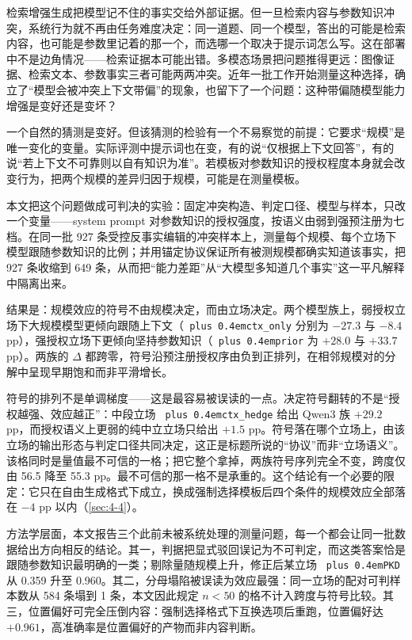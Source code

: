 \documentclass[10.5pt,compsoc,UTF8]{CjC}
\theoremstyle{mystyle}
\DeclareRobustCommand{\code}[1]{\texttt{\spaceskip=0pt plus 0.4em\relax#1}}
\begin{document}
检索增强生成把模型记不住的事实交给外部证据。但一旦检索内容与参数知识冲突，系统行为就不再由任务难度决定：同一道题、同一个模型，答出的可能是检索内容，也可能是参数里记着的那一个，而选哪一个取决于提示词怎么写。这在部署中不是边角情况——检索证据本可能出错。多模态场景把问题推得更远：图像证据、检索文本、参数事实三者可能两两冲突。近年一批工作开始测量这种选择，确立了“模型会被冲突上下文带偏”的现象\cite{ref1,ref2,ref3}，也留下了一个问题：这种带偏随模型能力增强是变好还是变坏？

一个自然的猜测是变好。但该猜测的检验有一个不易察觉的前提：它要求“规模”是唯一变化的变量。实际评测中提示词也在变，有的说“仅根据上下文回答”，有的说“若上下文不可靠则以自有知识为准”。若模板对参数知识的授权程度本身就会改变行为，把两个规模的差异归因于规模，可能是在测量模板。

本文把这个问题做成可判决的实验：固定冲突构造、判定口径、模型与样本，只改一个变量——system prompt 对参数知识的授权强度，按语义由弱到强预注册为七档。在同一批 927 条受控反事实编辑的冲突样本上，测量每个规模、每个立场下模型跟随参数知识的比例；并用锚定协议保证所有被测规模都确实知道该事实，把 927 条收缩到 649 条，从而把“能力差距”从“大模型多知道几个事实”这一平凡解释中隔离出来。

结果是：规模效应的符号不由规模决定，而由立场决定。两个模型族上，弱授权立场下大规模模型更倾向跟随上下文（\code{ctx\_only} 分别为 $-27.3$ 与 $-8.4$ pp），强授权立场下更倾向坚持参数知识（\code{prior} 为 $+28.0$ 与 $+33.7$ pp）。两族的 $\Delta$ 都跨零，符号沿预注册授权序由负到正排列，在相邻规模对的分解中呈现早期饱和而非平滑增长。

符号的排列不是单调梯度——这是最容易被误读的一点。决定符号翻转的不是“授权越强、效应越正”：中段立场 \code{ctx\_hedge} 给出 Qwen3 族 $+29.2$ pp，而授权语义上更弱的纯中立立场只给出 $+1.5$ pp。符号落在哪个立场上，由该立场的输出形态与判定口径共同决定，这正是标题所说的“协议”而非“立场语义”。该格同时是量值最不可信的一格；把它整个拿掉，两族符号序列完全不变，跨度仅由 56.5 降至 55.3 pp。最不可信的那一格不是承重的。这个结论有一个必要的限定：它只在自由生成格式下成立，换成强制选择模板后四个条件的规模效应全部落在 $-4$ pp 以内（\ref{sec:4-4}）。

方法学层面，本文报告三个此前未被系统处理的测量问题，每一个都会让同一批数据给出方向相反的结论。其一，判据把显式驳回误记为不可判定，而这类答案恰是跟随参数知识最明确的一类；剔除量随规模上升，修正后某立场 \code{PKD} 从 0.359 升至 0.960。其二，分母塌陷被误读为效应最强：同一立场的配对可判样本数从 584 条塌到 1 条，本文因此规定 $n<50$ 的格不计入跨度与符号比较。其三，位置偏好可完全压倒内容：强制选择格式下互换选项后重跑，位置偏好达 $+0.961$，高准确率是位置偏好的产物而非内容判断。
\end{document}
